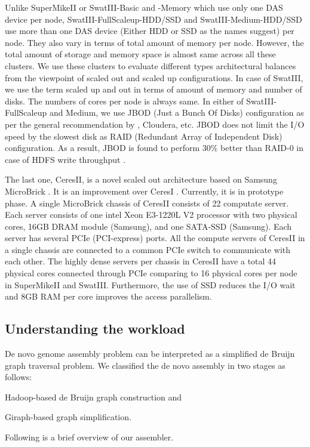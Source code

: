 \documentclass[10pt, conference, compsocconf]{IEEEtran}
\begin{document}
Unlike SuperMikeII or SwatIII-Basic and -Memory which use only one DAS device per node, SwatIII-FullScaleup-HDD/SSD and SwatIII-Medium-HDD/SSD use more than one DAS device (Either HDD or SSD as the names suggest) per node. They also vary in terms of total amount of memory per node. However, the total amount of storage and memory space is almost same across all these clusters. We use these clusters to evaluate different types architectural balances from the viewpoint of scaled out and scaled up configurations. In case of SwatIII, we use the term scaled up and out in terms of amount of memory and number of disks. The numbers of cores per node is always same. In either of SwatIII-FullScaleup and Medium, we use JBOD (Just a Bunch Of Disks) configuration as per the general recommendation by \cite{fw:hadoop}, Cloudera, etc. JBOD does not limit the I/O speed by the slowest disk as RAID (Redundant Array of Independent Disk) configuration. As a result, JBOD is found to perform 30\% better than RAID-0 in case of HDFS write throughput \cite{fw:hadoop}. 

The last one, CeresII, is a novel scaled out architecture based on Samsung MicroBrick \cite{Cluster:MicroBrick}. It is an improvement over CeresI \cite{Cluster:ceres1}. Currently, it is in prototype phase.  
A single MicroBrick chassis of CeresII consists of 22 computate server. Each server consists of one intel Xeon E3-1220L V2 processor with two physical cores, 16GB DRAM module (Samsung), and  one SATA-SSD (Samsung). Each server has several PCIe (PCI-express) ports.  All the compute servers of CeresII in a single chassis are connected to a common PCIe switch to communicate with each other. The highly dense servers per chassis in CeresII have a total 44 physical cores connected through PCIe comparing to 16 physical cores per node in SuperMikeII and SwatIII. Furthermore, the use of SSD reduces the I/O wait and 8GB RAM per core improves the access parallelism.

\subsection {Understanding the workload} \label{TheWorkload}
De novo genome assembly problem can be interpreted as a simplified de Bruijn graph traversal problem. We classified the de novo assembly in two stages as follows:
\begin{inparaenum}
\item Hadoop-based de Bruijn graph construction and
\item Giraph-based graph simplification.  
\end{inparaenum}
Following is a brief overview of our assembler. 
\end{document}

